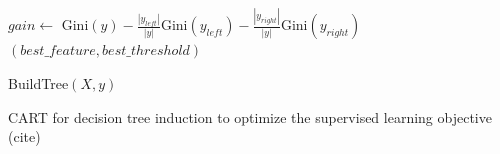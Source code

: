 \begin{algorithm}
{{{                $gain \leftarrow$ Gini$(y) - \frac{|y_{left}|}{|y|}$Gini$(y_{left}) - \frac{|y_{right}|}{|y|}$Gini$(y_{right})$ \\
                
            }
        }
        \Return $(best\_feature, best\_threshold)$
    }
    
    
    \Return BuildTree$(X, y)$
    \caption{CART for decision tree induction to optimize the supervised learning objective (cite)}\label{alg:cart}
\end{algorithm}

